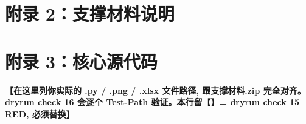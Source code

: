 \section*{附录 2：支撑材料说明}


\section*{附录 3：核心源代码}




\textbf{【在这里列你实际的 .py / .png / .xlsx 文件路径, 跟支撑材料.zip 完全对齐。dryrun check 16 会逐个 Test-Path 验证。本行留【】= dryrun check 15 RED, 必须替换】}

